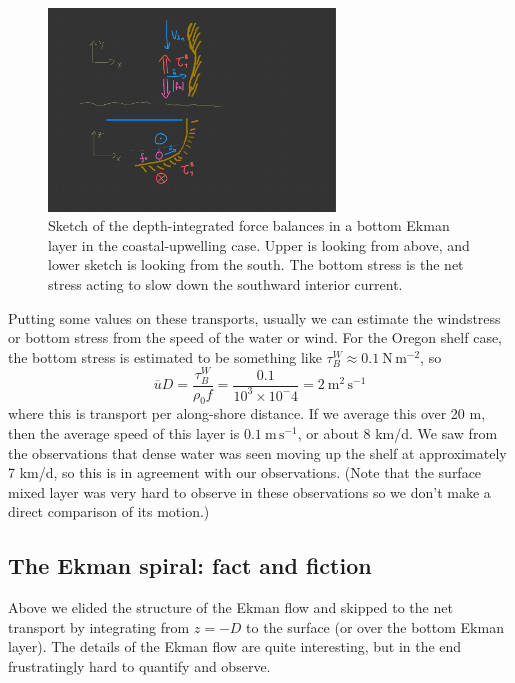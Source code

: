 \begin{figure}[hbt]
  \begin{center}
    \includegraphics[width=3in]{figs/Coriolis/EkmanBottomForces}
    \caption{Sketch of the depth-integrated force balances in a bottom Ekman layer in the coastal-upwelling case. Upper is looking from above, and lower sketch is looking from the south. The bottom stress is the net stress acting to slow down the southward interior current.}
    \label{fig:EkmanBottomForces}  
  \end{center}
\end{figure}

Putting some values on these transports, usually we can estimate the windstress or bottom stress from the speed of the water or wind.  For the Oregon shelf case, the bottom stress is estimated to be something like $\tau_B^W\approx 0.1 \ \mathrm{N\,m^{-2}}$, so 
\begin{equation}
    \overline{u}D = \frac{\tau_B^W}{\rho_0 f} = \frac{0.1}{10^3 \times 10^-4} = 2\ \mathrm{m^2\,s^{-1}}
\end{equation}
where this is transport per along-shore distance.  If we average this over 20 m, then the average speed of this layer is $0.1\ \mathrm{m\,s^{-1}}$, or about 8 km/d.   We saw from the observations that dense water was seen moving up the shelf at approximately 7 km/d, so this is in agreement with our observations.  (Note that the surface mixed layer was very hard to observe in these observations so we don't make a direct comparison of its motion.)

\subsection{The Ekman spiral: fact and fiction}

Above we elided the structure of the Ekman flow and skipped to the net transport by integrating from $z=-D$ to the surface (or over the bottom Ekman layer).  The details of the Ekman flow are quite interesting, but in the end frustratingly hard to quantify and observe.

